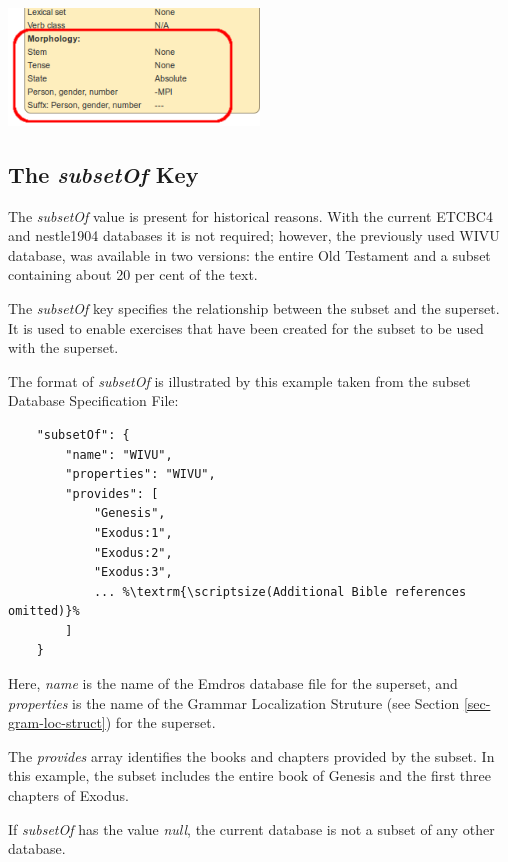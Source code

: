 \documentclass[11pt,oneside,a4paper]{memoir}
\begin{document}
\begin{center}
  \includegraphics[width=0.5\textwidth]{morph2.png}
\end{center}

\subsection{The \emph{subsetOf} Key}\label{subsetof}

The \emph{subsetOf} value is present for historical reasons. With the current ETCBC4 and nestle1904
databases it is not required; however, the previously used WIVU database, was available in two
versions: the entire Old Testament and a subset containing about 20 per cent of the text.

The \emph{subsetOf} key specifies the relationship between the subset and the superset. It is used
to enable exercises that have been created for the subset to be used with the superset.

The format of \emph{subsetOf} is illustrated by this example taken from the subset Database
Specification File:

\begin{lstlisting}
    "subsetOf": {
        "name": "WIVU",
        "properties": "WIVU",
        "provides": [
            "Genesis",
            "Exodus:1",
            "Exodus:2",
            "Exodus:3",
            ... %\textrm{\scriptsize(Additional Bible references omitted)}%
        ]
    }
\end{lstlisting}

Here, \emph{name} is the name of the Emdros database file for the superset, and \emph{properties} is
the name of the Grammar Localization Struture (see
Section \ref{sec-gram-loc-struct}) for the superset.

The \emph{provides} array identifies the books and chapters provided by the subset. In this example,
the subset includes the entire book of Genesis and the first three chapters of Exodus.

If \emph{subsetOf} has the value \emph{null}, the current database is not a subset of any other
database.
\end{document}
